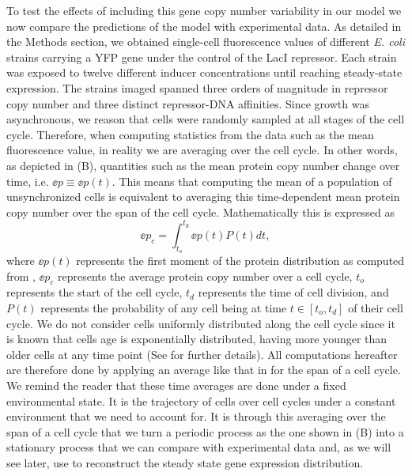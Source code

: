 To test the effects of including this gene copy number variability in our model
we now compare the predictions of the model with experimental data. As detailed
in the Methods section, we obtained single-cell fluorescence values of
different {\it E. coli} strains carrying a YFP gene under the control of the
LacI repressor. Each strain was exposed to twelve different inducer
concentrations until reaching steady-state expression. The strains imaged
spanned three orders of magnitude in repressor copy number and three distinct
repressor-DNA affinities. Since growth was asynchronous, we reason that cells
were randomly sampled at all stages of the cell cycle. Therefore, when
computing statistics from the data such as the mean fluorescence value, in
reality we are averaging over the cell cycle. In other words, as depicted in
(B), quantities such as the mean protein copy number
change over time, i.e. $\ee{p} \equiv \ee{p(t)}$. This means that computing the
mean of a population of unsynchronized cells is equivalent to averaging this
time-dependent mean protein copy number over the span of the cell cycle.
Mathematically this is expressed as
\begin{equation}
	\ee{p}_c = \int_{t_o}^{t_d} \ee{p(t)} P(t) dt,
	\label{eq_time_avg}
\end{equation}
where $\ee{p(t)}$ represents the first moment of the protein distribution as
computed from , $\ee{p}_c$ represents the average protein
copy number over a cell cycle, $t_o$ represents the start of the cell cycle,
$t_d$ represents the time of cell division, and $P(t)$ represents the
probability of any cell being at time $t \in [t_o, t_d]$ of their cell cycle.
We do not consider cells uniformly distributed along the cell cycle since it is
known that cells age is exponentially distributed, having more younger than
older cells at any time point \cite{Powell1956} (See 
for further details). All computations hereafter are therefore done by applying
an average like that in  for the span of a cell cycle. We
remind the reader that these time averages are done under a fixed environmental
state. It is the trajectory of cells over cell cycles under a constant
environment that we need to account for. It is through this averaging over the
span of a cell cycle that we turn a periodic process as the one shown in
(B) into a stationary process that we can compare with
experimental data and, as we will see later, use to reconstruct the steady
state gene expression distribution.


